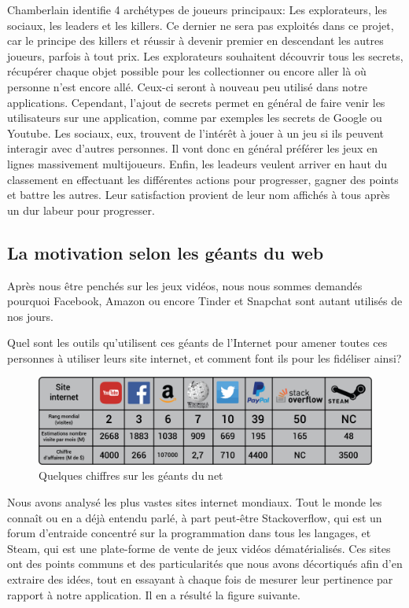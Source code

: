 \documentclass[pidr]{tnreport}
\begin{document}
Chamberlain identifie 4 archétypes de joueurs principaux: Les explorateurs, les sociaux, les leaders et les killers. Ce dernier ne sera pas exploités dans ce projet, car le principe des killers et réussir à devenir premier en descendant les autres joueurs, parfois à tout prix. Les explorateurs souhaitent découvrir tous les secrets, récupérer chaque objet possible pour les collectionner ou encore aller là où personne n’est encore allé. Ceux-ci seront à nouveau peu utilisé dans notre applications. Cependant, l’ajout de secrets permet en général de faire venir les utilisateurs sur une application, comme par exemples les secrets de Google ou Youtube. Les sociaux, eux, trouvent de l'intérêt à jouer à un jeu si ils peuvent interagir avec d’autres personnes. Il vont donc en général préférer les jeux en lignes massivement multijoueurs. Enfin, les leadeurs veulent arriver en haut du classement en effectuant les différentes actions pour progresser, gagner des points et battre les autres. Leur satisfaction provient de leur nom affichés à tous après un dur labeur pour progresser.

\subsection{La motivation selon les géants du web}

Après nous être penchés sur les jeux vidéos, nous nous sommes demandés pourquoi Facebook, Amazon ou encore Tinder et Snapchat sont autant utilisés de nos jours.


Quel sont les outils qu’utilisent ces géants de l’Internet pour amener toutes ces personnes à utiliser leurs site internet, et comment font ils pour les fidéliser ainsi?

\begin{figure}[h]
  \centering
  \includegraphics[width=17cm]{figures/topWebsites}
  \caption{Quelques chiffres sur les géants du net}
  \label{fig:top-sites}
\end{figure}

Nous avons analysé les plus vastes sites internet mondiaux. Tout le monde les connaît ou en a déjà entendu parlé, à part peut-être Stackoverflow, qui est un forum d’entraide concentré sur la programmation dans tous les langages, et Steam, qui est une plate-forme de vente de jeux vidéos dématérialisés. Ces sites ont des points communs et des particularités que nous avons décortiqués afin d’en extraire des idées, tout en essayant à chaque fois de mesurer leur pertinence par rapport à notre application. Il en a résulté la figure suivante.
\end{document}
